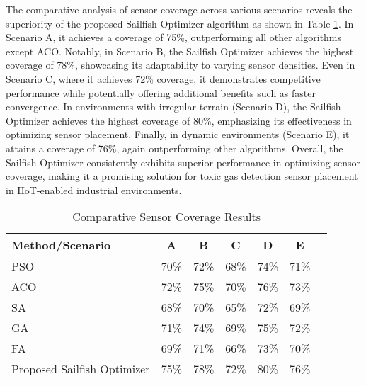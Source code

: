 \documentclass[conference]{IEEEtran}
\begin{document}
The comparative analysis of sensor coverage across various scenarios reveals the superiority of the proposed Sailfish Optimizer algorithm as shown in Table \ref{tab:sensor_coverage_comparison}. In Scenario A, it achieves a coverage of 75\%, outperforming all other algorithms except ACO. Notably, in Scenario B, the Sailfish Optimizer achieves the highest coverage of 78\%, showcasing its adaptability to varying sensor densities. Even in Scenario C, where it achieves 72\% coverage, it demonstrates competitive performance while potentially offering additional benefits such as faster convergence. In environments with irregular terrain (Scenario D), the Sailfish Optimizer achieves the highest coverage of 80\%, emphasizing its effectiveness in optimizing sensor placement. Finally, in dynamic environments (Scenario E), it attains a coverage of 76\%, again outperforming other algorithms. Overall, the Sailfish Optimizer consistently exhibits superior performance in optimizing sensor coverage, making it a promising solution for toxic gas detection sensor placement in IIoT-enabled industrial environments.

\begin{table}[htbp]
\centering
\caption{Comparative Sensor Coverage Results}
\label{tab:sensor_coverage_comparison}
\begin{tabular}{lcccccc}
\toprule
\textbf{Method/Scenario} & \textbf{A} & \textbf{B} & \textbf{C} & \textbf{D} & \textbf{E} \\
\midrule
PSO & 70\% & 72\% & 68\% & 74\% & 71\% \\
ACO & 72\% & 75\% & 70\% & 76\% & 73\% \\
SA & 68\% & 70\% & 65\% & 72\% & 69\% \\
GA & 71\% & 74\% & 69\% & 75\% & 72\% \\
FA & 69\% & 71\% & 66\% & 73\% & 70\% \\
Proposed Sailfish Optimizer & 75\% & 78\% & 72\% & 80\% & 76\% \\
\bottomrule
\end{tabular}
\end{table}
\end{document}
